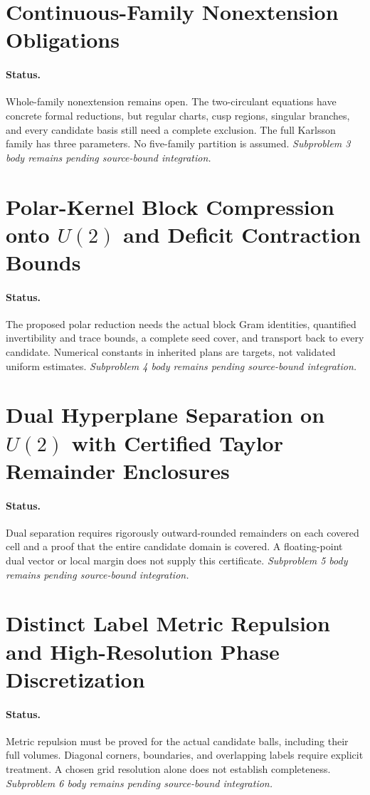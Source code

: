 \documentclass[11pt,a4paper]{article}
\theoremstyle{plain}
\theoremstyle{definition}
\begin{document}
\section{Continuous-Family Nonextension Obligations}
\paragraph{Status.} Whole-family nonextension remains open. The two-circulant equations have concrete formal reductions, but regular charts, cusp regions, singular branches, and every candidate basis still need a complete exclusion. The full Karlsson family has three parameters. No five-family partition is assumed.
\emph{Subproblem 3 body remains pending source-bound integration.}

\section{Polar-Kernel Block Compression onto $U(2)$ and Deficit Contraction Bounds}
\paragraph{Status.} The proposed polar reduction needs the actual block Gram identities, quantified invertibility and trace bounds, a complete seed cover, and transport back to every candidate. Numerical constants in inherited plans are targets, not validated uniform estimates.
\emph{Subproblem 4 body remains pending source-bound integration.}

\section{Dual Hyperplane Separation on $U(2)$ with Certified Taylor Remainder Enclosures}
\paragraph{Status.} Dual separation requires rigorously outward-rounded remainders on each covered cell and a proof that the entire candidate domain is covered. A floating-point dual vector or local margin does not supply this certificate.
\emph{Subproblem 5 body remains pending source-bound integration.}

\section{Distinct Label Metric Repulsion and High-Resolution Phase Discretization}
\paragraph{Status.} Metric repulsion must be proved for the actual candidate balls, including their full volumes. Diagonal corners, boundaries, and overlapping labels require explicit treatment. A chosen grid resolution alone does not establish completeness.
\emph{Subproblem 6 body remains pending source-bound integration.}
\end{document}
